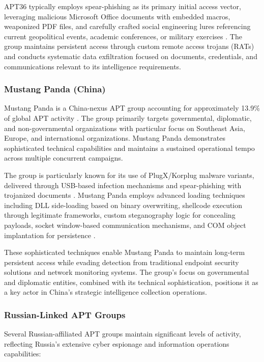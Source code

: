 APT36 typically employs spear-phishing as its primary initial access vector, leveraging malicious Microsoft Office documents with embedded macros, weaponized PDF files, and carefully crafted social engineering lures referencing current geopolitical events, academic conferences, or military exercises \cite{brandefense2025}. The group maintains persistent access through custom remote access trojans (RATs) and conducts systematic data exfiltration focused on documents, credentials, and communications relevant to its intelligence requirements.

\subsubsection{Mustang Panda (China)}

Mustang Panda is a China-nexus APT group accounting for approximately 13.9\% of global APT activity \cite{trellix2025}. The group primarily targets governmental, diplomatic, and non-governmental organizations with particular focus on Southeast Asia, Europe, and international organizations. Mustang Panda demonstrates sophisticated technical capabilities and maintains a sustained operational tempo across multiple concurrent campaigns.

The group is particularly known for its use of PlugX/Korplug malware variants, delivered through USB-based infection mechanisms and spear-phishing with trojanized documents \cite{eset2025}. Mustang Panda employs advanced loading techniques including DLL side-loading based on binary overwriting, shellcode execution through legitimate frameworks, custom steganography logic for concealing payloads, socket window-based communication mechanisms, and COM object implantation for persistence \cite{eset2025}.

These sophisticated techniques enable Mustang Panda to maintain long-term persistent access while evading detection from traditional endpoint security solutions and network monitoring systems. The group's focus on governmental and diplomatic entities, combined with its technical sophistication, positions it as a key actor in China's strategic intelligence collection operations.

\subsubsection{Russian-Linked APT Groups}

Several Russian-affiliated APT groups maintain significant levels of activity, reflecting Russia's extensive cyber espionage and information operations capabilities:

